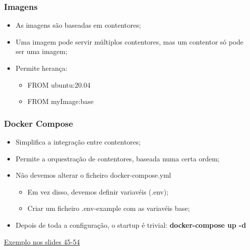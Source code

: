 \documentclass{article}
\begin{document}
\subsubsection{Imagens}

\begin{itemize}
  \item As imagens são baseadas em contentores;
  \item Uma imagem pode servir múltiplos contentores, mas um contentor
  só pode ser uma imagem;
  \item Permite herança:
  \begin{itemize}
    \item FROM ubuntu:20.04
    \item FROM myImage:base
  \end{itemize}
\end{itemize}

\subsubsection{Docker Compose}

\begin{itemize}
  \item Simplifica a integração entre contentores;
  \item Permite a orquestração de contentores, baseada numa certa ordem;
  \item Não devemos alterar o ficheiro docker-compose.yml
  \begin{itemize}
    \item Em vez disso, devemos definir variavéis (.env);
    \item Criar um ficheiro .env-example com as variavéis base;
  \end{itemize}

  \item Depois de toda a configuração, o startup é trivial: \textbf{docker-compose up -d}
\end{itemize}

\uline{Exemplo nos slides 45-54}

\pagebreak
\end{document}
